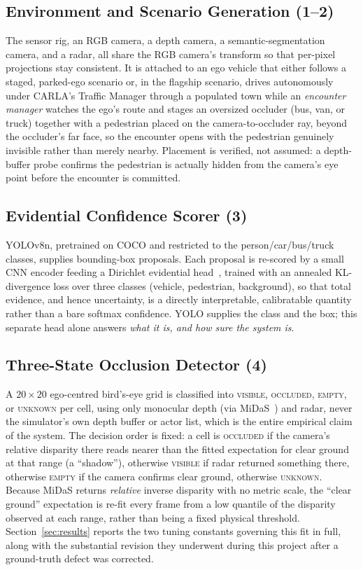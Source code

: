 \documentclass[conference]{IEEEtran}
\begin{document}
\subsection{Environment and Scenario Generation (1--2)}

The sensor rig, an RGB camera, a depth camera, a semantic-segmentation
camera, and a radar, all share the RGB camera's transform so that
per-pixel projections stay consistent. It is attached to an ego vehicle
that either follows a staged, parked-ego scenario or, in the flagship
scenario, drives autonomously under CARLA's Traffic Manager through a
populated town while an \emph{encounter manager} watches the ego's
route and stages an oversized occluder (bus, van, or truck) together
with a pedestrian placed on the camera-to-occluder ray, beyond the
occluder's far face, so the encounter opens with the pedestrian
genuinely invisible rather than merely nearby. Placement is verified,
not assumed: a depth-buffer probe confirms the pedestrian is actually
hidden from the camera's eye point before the encounter is committed.

\subsection{Evidential Confidence Scorer (3)}

YOLOv8n, pretrained on COCO and restricted to the person/car/bus/truck
classes, supplies bounding-box proposals. Each proposal is re-scored by
a small CNN encoder feeding a Dirichlet evidential head~\cite{sensoy2018},
trained with an annealed KL-divergence loss over three classes
(vehicle, pedestrian, background), so that total evidence, and hence
uncertainty, is a directly interpretable, calibratable quantity rather
than a bare softmax confidence. YOLO supplies the class and the box;
this separate head alone answers \emph{what it is, and how sure the
system is}.

\subsection{Three-State Occlusion Detector (4)}

A $20\times20$ ego-centred bird's-eye grid is classified into
\textsc{visible}, \textsc{occluded}, \textsc{empty}, or \textsc{unknown}
per cell, using only monocular depth (via MiDaS~\cite{ranftl2020}) and
radar, never the simulator's own depth buffer or actor list, which is
the entire empirical claim of the system. The decision order is fixed:
a cell is \textsc{occluded} if the camera's relative disparity there
reads nearer than the fitted expectation for clear ground at that range
(a ``shadow''), otherwise \textsc{visible} if radar returned something
there, otherwise \textsc{empty} if the camera confirms clear ground,
otherwise \textsc{unknown}. Because MiDaS returns \emph{relative}
inverse disparity with no metric scale, the ``clear ground''
expectation is re-fit every frame from a low quantile of the disparity
observed at each range, rather than being a fixed physical threshold.
Section~\ref{sec:results} reports the two tuning constants governing
this fit in full, along with the substantial revision they underwent
during this project after a ground-truth defect was corrected.
\end{document}

